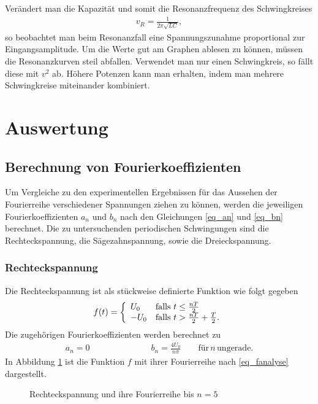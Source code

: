 Verändert man die Kapazität und somit die Resonanzfrequenz des Schwingkreises
\begin{align}
v_R=\frac{1}{2\pi\sqrt{LC}},
\end{align}
so beobachtet man beim Resonanzfall eine Spannungszunahme proportional zur Eingangsamplitude. Um die Werte gut am Graphen ablesen zu können, müssen die Resonanzkurven steil abfallen. Verwendet man nur einen Schwingkreis, so fällt diese mit $v^2$ ab. Höhere Potenzen kann man erhalten, indem man mehrere Schwingkreise miteinander kombiniert.

\section{Auswertung}
\subsection{Berechnung von Fourierkoeffizienten}
\label{sec_berechnung}
Um Vergleiche zu den experimentellen Ergebnissen für das Aussehen der Fourierreihe verschiedener Spannungen ziehen zu können, werden
die jeweiligen Fourierkoeffizienten $a_n$ und $b_n$ nach den Gleichungen \eqref{eq_an} und \eqref{eq_bn} berechnet. Die zu untersuchenden
periodischen Schwingungen sind die Rechteckspannung, die Sägezahnspannung, sowie die Dreieckspannung. 
\subsubsection{Rechteckspannung}
Die Rechteckspannung ist als stückweise definierte Funktion wie folgt gegeben
\begin{align*}			
f(t) =
\left\{
	\begin{array}{l l}
	U_0  & \text{falls } t \leq \frac{nT}{2}\\
	-U_0 & \text{falls } t > \frac{nT}{2}+\frac{T}{2}.
	\end{array}
\right.
\end{align*}
Die zugehörigen Fourierkoeffizienten werden berechnet zu
\begin{align}
 a_n = 0 \hspace{3cm} b_n = \frac{4U_0}{n \pi} \qquad \text{für}\, n\, \text{ungerade}.
\end{align}
In Abbildung \ref{pic_rechteckfourier} ist die Funktion $f$ mit ihrer Fourierreihe nach \eqref{eq_fanalyse} dargestellt.
\begin{figure}[H]
 
 \caption{Rechteckspannung und ihre Fourierreihe bis $n=5$}
 \label{pic_rechteckfourier}
\end{figure}

